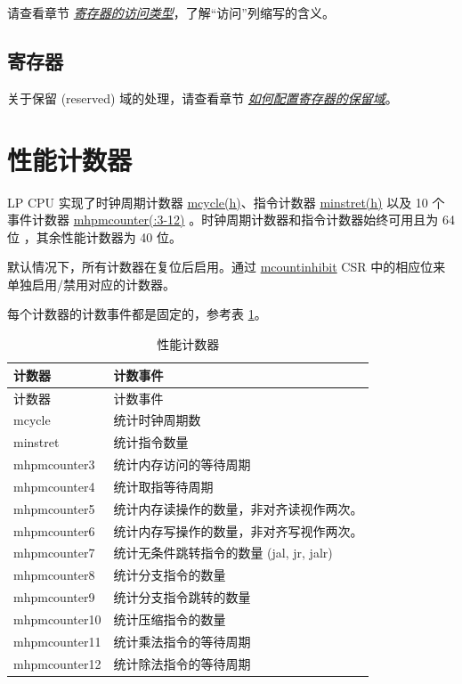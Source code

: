 \documentclass[main\_\_CN.tex]{subfiles}
\begin{document}
请查看章节 \hyperref[glossary-access-types]{\textit{寄存器的访问类型}}，了解“访问”列缩写的含义。



\subsection{寄存器}

关于保留 (reserved) 域的处理，请查看章节 \hyperref[programming-reserved-field]{\textit{如何配置寄存器的保留域}}。




\section{性能计数器}

LP CPU 实现了时钟周期计数器 \hyperref[regdesc:LPMCYCLEH]{mcycle(h)}、指令计数器 \hyperref[regdesc:LPMINSTRETH]{minstret(h)} 以及 10 个事件计数器 \hyperref[regdesc:LPMHPMCOUNTER]{mhpmcounter(:3-12)} 。时钟周期计数器和指令计数器始终可用且为 64 位 ，其余性能计数器为 40 位。

默认情况下，所有计数器在复位后启用。通过 \hyperref[regdesc:LPMCOUNTINHIBIT]{mcountinhibit} CSR 中的相应位来单独启用/禁用对应的计数器。

每个计数器的计数事件都是固定的，参考表 \ref{tab:ulp-pccr}。

\begin{longtable}[c]{|l|l|}
    \caption{性能计数器}\label{tab:ulp-pccr}\\\hline
    \rowcolor{lightgray}
    计数器 & 计数事件 \\\hline
    \endfirsthead
    \hline
    \rowcolor{lightgray}
    计数器 & 计数事件 \\\hline
    \endhead
    \endfoot

    mcycle      & 统计时钟周期数  \\\hline
    minstret    & 统计指令数量 \\\hline
    mhpmcounter3 & 统计内存访问的等待周期  \\\hline
    mhpmcounter4 & 统计取指等待周期 \\\hline
    mhpmcounter5 &  统计内存读操作的数量，非对齐读视作两次。  \\\hline

    mhpmcounter6 & 统计内存写操作的数量，非对齐写视作两次。 \\\hline
    mhpmcounter7 & 统计无条件跳转指令的数量 (jal, jr, jalr)\\\hline
    mhpmcounter8 & 统计分支指令的数量 \\\hline
    mhpmcounter9 & 统计分支指令跳转的数量  \\\hline
    mhpmcounter10 & 统计压缩指令的数量  \\\hline
    mhpmcounter11 & 统计乘法指令的等待周期  \\\hline
    mhpmcounter12 & 统计除法指令的等待周期  \\\hline

\end{longtable}
\end{document}
